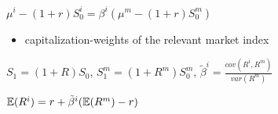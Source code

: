 \begin{prop}
    $\mu^i - (1 + r)S_0^i = \beta^i (\mu^m - (1 + r)S_0^m)$
\end{prop}

\begin{itemize}
    \item capitalization-weights of the relevant market index
\end{itemize}

\begin{setting}

\end{setting}
    $S_1 = (1 + R)S_0$, $S_1^m = (1 + R^m)S_0^m$, $\tilde\beta^i = \frac{cov(R^i, R^m)}{var(R^m)}$
\begin{fact}
    $\mathbb{E}(R^i) = r + \tilde\beta^i(\mathbb{E}(R^m) - r)$
\end{fact}